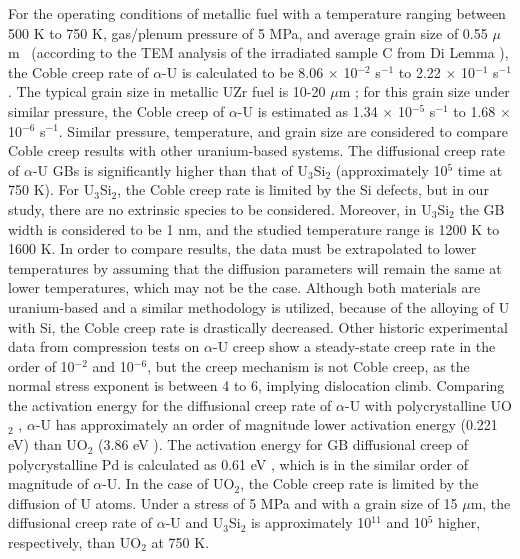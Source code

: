 \documentclass[review]{elsarticle}
\begin{document}
For the operating conditions of metallic fuel \cite{recent_review} with a temperature ranging between 500 K to 750 K, gas/plenum pressure of 5 MPa, and average grain size of 0.55 $\mu$m \ (according to the TEM analysis of the irradiated sample C from Di Lemma \cite{DILEMMA2020152467}), the Coble creep rate of $\alpha$-U is calculated to be 8.06 $\times$ 10$^{-2}$ s$^{-1}$ to 2.22 $\times$ 10$^{-1}$ s$^{-1}$. The typical grain size in metallic UZr fuel is 10-20 $\mu$m \cite{osti_1469797}; for this grain size under similar pressure, the Coble creep of $\alpha$-U is estimated as 1.34 $\times$ 10$^{-5}$ s$^{-1}$ to 1.68 $\times$ 10$^{-6}$ s$^{-1}$. Similar pressure, temperature, and grain size are considered to compare Coble creep results with other uranium-based systems. The diffusional creep rate of $\alpha$-U GBs is significantly higher than that of U$_\mathrm{3}$Si$_\mathrm{2}$ (approximately 10$^{5}$ time at 750 K). For U$_\mathrm{3}$Si$_\mathrm{2}$, the Coble creep rate is limited by the Si defects, but in our study, there are no extrinsic species to be considered. Moreover, in U$_\mathrm{3}$Si$_\mathrm{2}$ \cite{COOPER2021153129} the GB width is considered to be 1 nm, and the studied temperature range is 1200 K to 1600 K. In order to compare results, the data must be extrapolated to lower temperatures by assuming that the diffusion parameters will remain the same at lower temperatures, which may not be the case. Although both materials are uranium-based and a similar methodology is utilized, because of the alloying of U with Si, the Coble creep rate is drastically decreased. Other historic experimental data \cite{ROBINSON1973293} from compression tests on $\alpha$-U creep show a steady-state creep rate in the order of 10$^{-2}$ and 10$^{-6}$, but the creep mechanism is not Coble creep, as the normal stress exponent is between 4 to 6, implying dislocation climb. Comparing the activation energy for the diffusional creep rate of $\alpha$-U with polycrystalline UO$_\mathrm{2}$ \cite{DESAI20084489}, $\alpha$-U has approximately an order of magnitude lower activation energy (0.221 eV) than UO$_\mathrm{2}$ (3.86 eV \cite{DESAI20084489}). The activation energy for GB diffusional creep of polycrystalline Pd is calculated as 0.61 eV \cite{YAMAKOV200261_Pd_creep}, which is in the similar order of magnitude of $\alpha$-U. In the case of UO$_2$, the Coble creep rate is limited by the diffusion of U atoms. Under a stress of 5 MPa and with a grain size of 15 $\mu$m, the diffusional creep rate of $\alpha$-U and U$_\mathrm{3}$Si$_\mathrm{2}$ is approximately 10$^{11}$ and 10$^{5}$ higher, respectively, than UO$_\mathrm{2}$ at 750 K.  %
 
\end{document}
